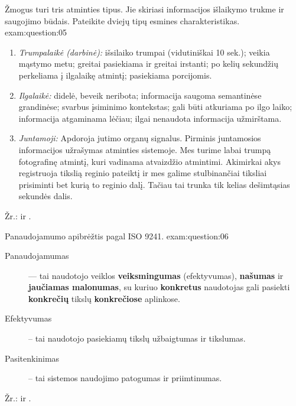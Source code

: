 \begin{question}{%
  Žmogus turi tris atminties tipus. Jie skiriasi informacijos išlaikymo
  trukme ir saugojimo būdais. Pateikite dviejų tipų esmines
  charakteristikas.
  }{exam:question:05}
  \begin{enumerate}
    \item \emph{Trumpalaikė (darbinė):}
      išsilaiko trumpai (vidutiniškai 10 sek.); veikia mąstymo metu;
      greitai pasiekiama ir greitai irstanti; po kelių sekundžių
      perkeliama į ilgalaikę atmintį; pasiekiama porcijomis.
    \item \emph{Ilgalaikė:}
      didelė, beveik neribota; informacija saugoma semantinėse
      grandinėse; svarbus įsiminimo kontekstas; gali būti atkuriama
      po ilgo laiko; informacija atgaminama lėčiau; ilgai nenaudota
      informacija užmirštama.
    \item \emph{Juntamoji:}
      Apdoroja jutimo organų signalus. Pirminis juntamosios
      informacijos užrašymas atminties sistemoje. Mes turime labai
      trumpą fotografinę atmintį, kuri vadinama atvaizdžio
      atmintimi. Akimirkai akys registruoja tikslią reginio pateiktį
      ir mes galime stulbinančiai tiksliai prisiminti bet kurią to
      reginio dalį. Tačiau tai trunka tik kelias dešimtąsias
      sekundės dalis.
  \end{enumerate}
  Žr.: \cite[33--34]{konspektas} ir \cite[21--25]{skaidres-3}.
\end{question}

\begin{question}{%
  Panaudojamumo apibrėžtis pagal ISO 9241.
  }{exam:question:06}
  \begin{description}
    \item[Panaudojamumas] — tai naudotojo veiklos
      \textbf{veiksmingumas} (efektyvumas), \textbf{našumas} ir
      \textbf{jaučiamas malonumas}, su kuriuo \textbf{konkretus}
      naudotojas gali pasiekti \textbf{konkrečių} tikslų
      \textbf{konkrečiose} aplinkose.
    \item[Efektyvumas] – tai naudotojo pasiekiamų tikslų
      užbaigtumas ir tikslumas.
    \item[Pasitenkinimas] – tai sistemos naudojimo patogumas ir
      priimtinumas.
  \end{description}
  Žr.: \cite[46p.]{konspektas} ir \cite[7]{skaidres-4}.
\end{question}

